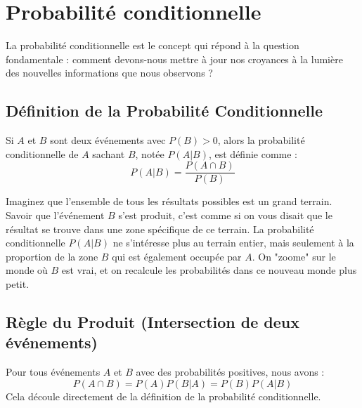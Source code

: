 \newpage

\section{Probabilité conditionnelle}

\begin{intuitionbox}
La probabilité conditionnelle est le concept qui répond à la question fondamentale : comment devons-nous mettre à jour nos croyances à la lumière des nouvelles informations que nous observons ?
\end{intuitionbox}

\subsection{Définition de la Probabilité Conditionnelle}

\begin{definitionbox}
Si $A$ et $B$ sont deux événements avec $P(B) > 0$, alors la probabilité conditionnelle de $A$ sachant $B$, notée $P(A|B)$, est définie comme :
$$P(A|B) = \frac{P(A \cap B)}{P(B)}$$
\end{definitionbox}

\begin{intuitionbox}
Imaginez que l'ensemble de tous les résultats possibles est un grand terrain. Savoir que l'événement $B$ s'est produit, c'est comme si on vous disait que le résultat se trouve dans une zone spécifique de ce terrain. La probabilité conditionnelle $P(A|B)$ ne s'intéresse plus au terrain entier, mais seulement à la proportion de la zone $B$ qui est également occupée par $A$. On "zoome" sur le monde où $B$ est vrai, et on recalcule les probabilités dans ce nouveau monde plus petit.
\end{intuitionbox}

\subsection{Règle du Produit (Intersection de deux événements)}

\begin{theorembox}
Pour tous événements $A$ et $B$ avec des probabilités positives, nous avons :
$$P(A \cap B) = P(A)P(B|A) = P(B)P(A|B)$$
Cela découle directement de la définition de la probabilité conditionnelle.
\end{theorembox}

